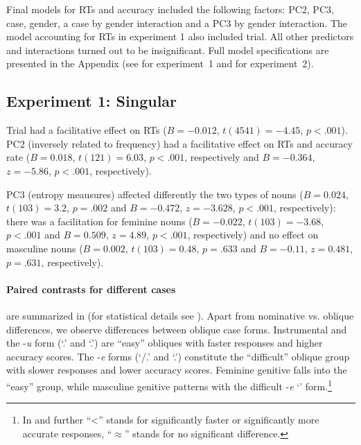 \documentclass[output=paper, modfonts,newtxmath,hidelinks]{langscibook}
\begin{document}
Final models for RTs and accuracy included the following factors: PC2, PC3, case, gender, a case by gender interaction and a PC3 by gender interaction. The model accounting for RTs in experiment 1 also included trial. All other predictors and interactions turned out to be insignificant. Full model specifications are presented in the Appendix (see  for experiment~1 and  for experiment~2).

\subsection{Experiment 1: Singular}

Trial had a facilitative effect on RTs ($B=-0.012$, $t(4541)=-4.45$, $p<.001$). PC2 (inversely related to frequency) had a facilitative effect on RTs and accuracy rate ($B= 0.018$, $t(121)= 6.03$, $p< .001$, respectively and $B= -0.364$, $z= -5.86$, $p< .001$, respectively). 

PC3 (entropy meausures) affected differently the two types of nouns ($B= 0.024$, $t(103)= 3.2$, $p= .002$ and $B= -0.472$, $z= -3.628$, $p< .001$, respectively):  there was a facilitation for feminine nouns ($B= -0.022$, $t(103)= -3.68$, $p< .001$ and $B= 0.509$, $z= 4.89$, $p< .001$, respectively) and no effect on masculine nouns ($B= 0.002$, $t(103)= 0.48$, $p= .633$ and $B= -0.11$, $z= 0.481$, $p= .631$, respectively).

\paragraph*{Paired contrasts for different cases} are summarized in  (for statistical details see ). Apart from nominative vs. oblique differences, we observe differences between oblique case forms. Instrumental and the -\textit{u} form (`\accc.\fem' and `\datt.\masc') are ``easy'' obliques with faster responses and higher accuracy scores. The -\textit{e} forms (`\datt/\locc.\fem' and `\locc.\masc') constitute the ``difficult'' oblique group with slower responses and lower accuracy scores. Feminine genitive falls into the ``easy'' group, while masculine genitive patterns with the difficult -\textit{e} `\locc' form.\footnote{In  and further ``<'' stands for significantly faster or significantly more accurate responses, ``$\approx$'' stands for no significant difference.}
\end{document}
